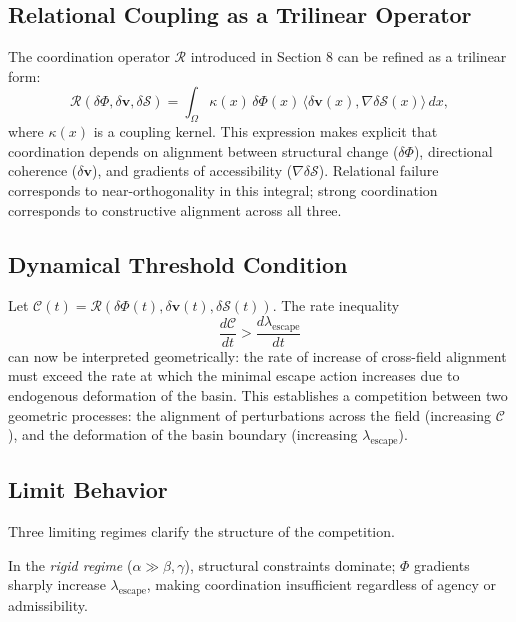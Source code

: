 \documentclass[11pt, a4paper]{article}
\begin{document}
\subsection{Relational Coupling as a Trilinear Operator}

The coordination operator $\mathcal{R}$ introduced in Section 8 can be refined as a trilinear form:
\begin{equation}
\mathcal{R}(\delta\Phi, \delta\mathbf{v}, \delta\mathcal{S})
= \int_{\Omega} \kappa(x)\, \delta\Phi(x)\, \langle \delta\mathbf{v}(x), \nabla \delta\mathcal{S}(x) \rangle \, dx,
\end{equation}
where $\kappa(x)$ is a coupling kernel. This expression makes explicit that coordination depends on alignment between structural change ($\delta\Phi$), directional coherence ($\delta\mathbf{v}$), and gradients of accessibility ($\nabla \delta\mathcal{S}$). Relational failure corresponds to near-orthogonality in this integral; strong coordination corresponds to constructive alignment across all three.

\subsection{Dynamical Threshold Condition}

Let $\mathcal{C}(t) = \mathcal{R}(\delta\Phi(t), \delta\mathbf{v}(t), \delta\mathcal{S}(t))$. The rate inequality
\begin{equation}
\frac{d\mathcal{C}}{dt} > \frac{d\lambda_{\mathrm{escape}}}{dt}
\end{equation}
can now be interpreted geometrically: the rate of increase of cross-field alignment must exceed the rate at which the minimal escape action increases due to endogenous deformation of the basin. This establishes a competition between two geometric processes: the alignment of perturbations across the field (increasing $\mathcal{C}$), and the deformation of the basin boundary (increasing $\lambda_{\mathrm{escape}}$).

\subsection{Limit Behavior}

Three limiting regimes clarify the structure of the competition.

In the \emph{rigid regime} ($\alpha \gg \beta, \gamma$), structural constraints dominate; $\Phi$ gradients sharply increase $\lambda_{\mathrm{escape}}$, making coordination insufficient regardless of agency or admissibility.
\end{document}
